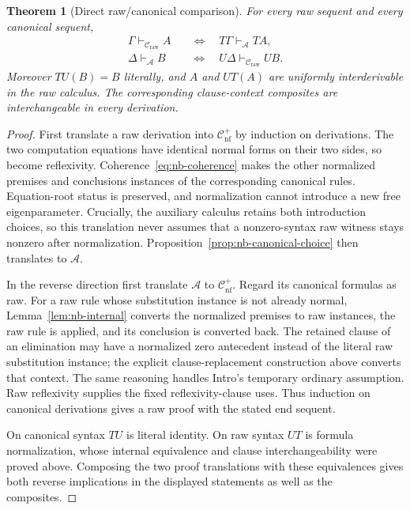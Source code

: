 \documentclass[11pt,a4paper]{article}
\newtheorem{theorem}{Theorem}[section]
\theoremstyle{definition}\newtheorem{definition}[theorem]{Definition}
\theoremstyle{remark}\newtheorem{remark}[theorem]{Remark}
\begin{document}
\begin{theorem}[Direct raw/canonical comparison]
\label{thm:direct-raw-canonical}
For every raw sequent and every canonical sequent,
\begin{align*}
 \Gamma\vdash_{\mathcal C_{\mathrm{raw}}}A
  &\quad\Longleftrightarrow\quad
        T\Gamma\vdash_{\mathcal A}T A,\\
 \Delta\vdash_{\mathcal A}B
  &\quad\Longleftrightarrow\quad
        U\Delta\vdash_{\mathcal C_{\mathrm{raw}}}U B.
\end{align*}
Moreover $TU(B)=B$ literally, and $A$ and $UT(A)$ are uniformly
interderivable in the raw calculus. The corresponding clause-context
composites are interchangeable in every derivation.
\end{theorem}
\begin{proof}
First translate a raw derivation into $\mathcal C_{\mathrm{nf}}^+$
by induction on derivations. The two computation equations have
identical normal forms on their two sides, so become reflexivity.
Coherence~\eqref{eq:nb-coherence} makes the other normalized
premises and conclusions instances of the corresponding canonical
rules. Equation-root status is preserved, and normalization cannot
introduce a new free eigenparameter. Crucially, the auxiliary calculus
retains both introduction choices, so this translation never assumes
that a nonzero-syntax raw witness stays nonzero after normalization.
Proposition~\ref{prop:nb-canonical-choice} then translates to
$\mathcal A$.

In the reverse direction first translate $\mathcal A$ to
$\mathcal C_{\mathrm{nf}}^+$. Regard its canonical formulas as raw.
For a raw rule whose substitution instance is not already normal,
Lemma~\ref{lem:nb-internal} converts the normalized premises to raw
instances, the raw rule is applied, and its conclusion is converted
back. The retained clause of an elimination may have a normalized
zero antecedent instead of the literal raw substitution instance;
the explicit clause-replacement construction above converts that
context. The same reasoning handles Intro's temporary ordinary
assumption. Raw reflexivity supplies the fixed reflexivity-clause
uses. Thus induction on canonical derivations gives a raw proof
with the stated end sequent.

On canonical syntax $TU$ is literal identity. On raw syntax $UT$
is formula normalization, whose internal equivalence and clause
interchangeability were proved above. Composing the two proof
translations with these equivalences gives both reverse implications
in the displayed statements as well as the composites.
\end{proof}
\end{document}
